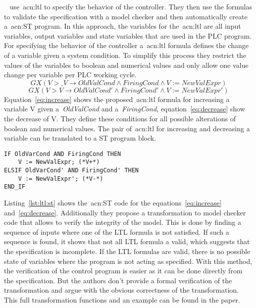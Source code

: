 \citeauthor{Kuzmin:2013}~\cite{Kuzmin:2013} use~\acrshort{acn:ltl} to specify the behavior of the controller.
They then use the formulas to validate the specification with a model checker and then automatically create a~\acrshort{acn:ST} program.
In this approach, the variables for the~\acrshort{acn:ltl} are all input variables, output variables and state variables that are used in the PLC program.
For specifying the behavior of the controller a~\acrfull{acn:ltl} formula defines the change of a variable given a system condition.
To simplify this process they restrict the values of the variables to boolean and numerical values and only allow one value change per variable per PLC working cycle.
\begin{equation}
GX\left(V > \_V \rightarrow OldValCond \land FiringCond \land V := NewValExpr \right)
\label{eq:increase}
\end{equation}
\begin{equation}
GX\left(V > V \rightarrow OldValCond' \land FiringCond' \land V := NewValExpr' \right)
\label{eq:decrease}
\end{equation}
Equation~\ref{eq:increase} shows the proposed~\acrshort{acn:ltl} formula for increasing a variable V given a~\textit{OldValCond} and a~\textit{FiringCond}, equation~\ref{eq:decrease} show the decrease of V.
They define these conditions for all possible alterations of boolean and numerical values.
The pair of~\acrshort{acn:ltl} for increasing and decreasing a variable can be translated to a ST program block.
\lstset{language=Pascal}
\begin{lstlisting}[caption={
Auto-generated~\gls{acn:ST} code realizing the~\acrshort{acn:ltl} formulas~\ref{eq:decrease} and~\ref{eq:increase}.},label=lst:ltl:st]
IF OldVarCond AND FiringCond THEN
    V := NewValExpr; (*V+*)
ELSIF OldVarCond' AND FiringCond' THEN
    V := NewValExpr'; (*V-*)
END_IF
\end{lstlisting}
Listing~\ref{lst:ltl:st} shows the~\acrshort{acn:ST} code for the equations~\ref{eq:increase} and~\ref{eq:decrease}.
Additionally they propose a transformation to model checker code that allows to verify the integrity of the model.
This is done by finding a sequence of inputs where one of the LTL formula is not satisfied.
If such a sequence is found, it shows that not all LTL formula a valid, which suggests that the specification is incomplete.
If the LTL formulas are valid, there is no possible state of variables where the program is not acting as specified.
With this method, the verification of the control program is easier as it can be done directly from the specification.
But the authors don't provide a formal verification of the transformation and argue with the obvious correctness of the transformation.
This full transformation functions and an example can be found in the paper.

